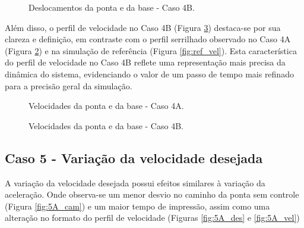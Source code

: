 \begin{figure}[H]
    \centering
    \hfill
    \caption{Deslocamentos da ponta e da base - Caso 4B.}
    \label{fig:4B_des}
\end{figure}
Além disso, o perfil de velocidade no Caso 4B (Figura \ref{fig:4B_vel}) destaca-se por sua clareza e definição, em contraste com o perfil serrilhado observado no Caso 4A (Figura \ref{fig:4A_vel}) e na simulação de referência (Figura \ref{fig:ref_vel}). Esta característica do perfil de velocidade no Caso 4B reflete uma representação mais precisa da dinâmica do sistema, evidenciando o valor de um passo de tempo mais refinado para a precisão geral da simulação.

\begin{figure}[H]
    \centering
    \hfill
    \caption{Velocidades da ponta e da base - Caso 4A.}
    \label{fig:4A_vel}
\end{figure}

\begin{figure}[H]
    \centering
    \hfill
    \caption{Velocidades da ponta e da base - Caso 4B.}
    \label{fig:4B_vel}
\end{figure}

\subsection{Caso 5 - Variação da velocidade desejada}
A variação da velocidade desejada possui efeitos similares à variação da aceleração. Onde observa-se um menor desvio no caminho da ponta sem controle (Figura \ref{fig:5A_cam}) e um maior tempo de impressão, assim como uma alteração no formato do perfil de velocidade (Figuras \ref{fig:5A_des} e \ref{fig:5A_vel})

